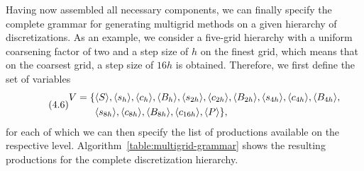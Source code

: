 Having now assembled all necessary components, we can finally specify the complete grammar for generating multigrid methods on a given hierarchy of discretizations.
As an example, we consider a five-grid hierarchy with a uniform coarsening factor of two and a step size of $h$ on the finest grid, which means that on the coarsest grid, a step size of $16h$ is obtained.
Therefore, we first define the set of variables 
\begin{equation}\tag{4.6}
\begin{split}
	V = \{ & \langle S \rangle, \langle s_h \rangle, \langle c_h \rangle, \langle B_h \rangle, \langle s_{2h} \rangle, \langle c_{2h} \rangle, \langle B_{2h} \rangle, \langle s_{4h} \rangle, \langle c_{4h} \rangle, \langle B_{4h} \rangle, \\
	& \langle s_{8h} \rangle, \langle c_{8h} \rangle, \langle B_{8h} \rangle, \langle c_{16h} \rangle, \langle P \rangle \},
\end{split}
\label{eq:multigrid-grammar-variables}
\end{equation}
for each of which we can then specify the list of productions available on the respective level. 
Algorithm~\ref{table:multigrid-grammar} shows the resulting productions for the complete discretization hierarchy.
